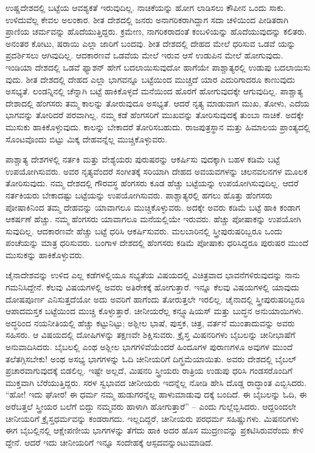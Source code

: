 ಉಷ್ಣದೇಶದಲ್ಲಿ ಬಟ್ಟೆಯ ಆವಶ್ಯಕತೆ ಇರುವುದಿಲ್ಲ. ನಾಚಿಕೆಯನ್ನು ಹೋಗ ಲಾಡಿಸಲು ಕೌಪೀನ ಒಂದು ಸಾಕು. ಉಳಿದುವೆಲ್ಲ ಕೇವಲ ಅಲಂಕಾರ. ಶೀತ ದೇಶದಲ್ಲಿ ಜನರು ಅನಾಗರಿಕರಾಗಿದ್ದಾಗ ಸದಾ ಚಳಿಯಿಂದ ಪೀಡಿತರಾಗಿ ಪ್ರಾಣಿಯ ಚರ್ಮವನ್ನು ಹೊದೆಯುತ್ತಿದ್ದರು. ಕ್ರಮೇಣ, ನಾಗರಿಕರಾದಂತೆ ಕಂಬಳಿಯನ್ನು ಹೊದೆಯುವುದನ್ನು ಕಲಿತರು. ಅನಂತರ ಕೋಟು, ಷರಾಯಿ ಎಲ್ಲಾ ಜಾರಿಗೆ ಬಂದವು. ಶೀತ ದೇಶದಲ್ಲಿ ದೇಹದ ಮೇಲೆ ಧರಿಸುವ ಒಡವೆ ಯನ್ನು ಪ್ರದರ್ಶಿಸಲು ಆಗಿವುದಿಲ್ಲ. ಆದಕಾರಣವೆ ಒಡವೆಯ ಮೇಲೆ ಇರುವ ಆಸೆ ಉಡುಪಿನ ಮೇಲೆ ಹೋಗುವುದು. ಇಂಡಿಯಾ ದೇಶದಲ್ಲಿ ಒಡವೆ ಫ್ಯಾಶನ್​ ಹೇಗೆ ಬದಲಾಯಿಸುವುದೋ ಹಾಗೆಯೇ ಪಾಶ್ಚಾತ್ಯರಲ್ಲಿ ಉಡುಪು ಬದಲಾಯಿಸು ವುದು. ಶೀತ ದೇಶದಲ್ಲಿ ದೇಹದ ಎಲ್ಲಾ ಭಾಗವನ್ನೂ ಬಟ್ಟೆಯಿಂದ ಮುಚ್ಚದೆ ಯಾರ ಎದುರಿಗಾದರೂ ಕಾಣುವುದು ಅಸಭ್ಯತೆ. ಲಂಡನ್ನಿನಲ್ಲಿ ಚೆನ್ನಾಗಿ ಬಟ್ಟೆ ಹಾಕಿಕೊಳ್ಳದೆ ಮನೆಯಿಂದ ಹೊರಗೆ ಹೋಗುವುದಕ್ಕೇ ಆಗುವುದಿಲ್ಲ. ಪಾಶ್ಚಾತ್ಯ ದೇಶಾದಲ್ಲಿ ಹೆಂಗಸರು ತಮ್ಮ ಕಾಲನ್ನು ತೋರುವುದೂ ಅಸಭ್ಯತೆ. ಆದರೆ ನೃತ್ಯ ಮಾಡುವಾಗ ಮುಖ, ತೋಳು, ಎದೆಯ ಭಾಗವನ್ನು ತೋರಿದರೆ ಪರವಾಗಿಲ್ಲ. ನಮ್ಮ ಕಡೆ ಹೆಂಗಸರಿಗೆ ಮುಖವನ್ನು ತೋರಿಸುವುದಕ್ಕೆ ತುಂಬಾ ನಾಚಿಕೆ. ಅದಕ್ಕೇ ಮುಸುಕು ಹಾಕಿಕೊಳ್ಳುವುದು. ಕಾಲನ್ನು ಬೇಕಾದರೆ ತೋರಿಸಬಹುದು. ರಾಜಪುತ್ರಸ್ಥಾನ ಮತ್ತು ಹಿಮಾಲಯ ಪ್ರಾಂತ್ಯದಲ್ಲಿ ಸೊಂಟವೊಂದು ಬಿಟ್ಟು ಮಿಕ್ಕ ದೇಹವನ್ನೆಲ್ಲ ಮುಚ್ಚಿಕೊಳ್ಳುವರು.

ಪಾಶ್ಚಾತ್ಯ ದೇಶಗಳಲ್ಲಿ ನರ್ತಕಿ ಮತ್ತು ವೇಶ್ಯೆಯರು ಪುರುಷರನ್ನು ಆಕರ್ಷಿಸು ವುದಕ್ಕಾಗಿ ಬಹಳ ಕಡಿಮೆ ಬಟ್ಟೆ ಉಪಯೋಗಿಸುವರು. ಅವರ ನೃತ್ಯವೆಂದರೆ ಸಂಗೀತಕ್ಕೆ ಸರಿಯಾಗಿ ದೇಹದ ಅವಯವಗಳನ್ನು ಚಲನವಲನಗಳ ಮೂಲಕ ತೋರಿಸುವುದು. ನಮ್ಮ ದೇಶದಲ್ಲಿ ಗೌರವಸ್ಥ ಹೆಂಗಸರು ಕೂಡ ಹೆಚ್ಚು ಬಟ್ಟೆಯನ್ನು ಉಪಯೋಗಿಸುವುದಿಲ್ಲ. ಆದರೆ ನರ್ತಕಿಯರು ಬೇಕಾದಷ್ಟು ಬಟ್ಟೆಯನ್ನು ಉಪಯೋಗಿಸುವರು. ಪಾಶ್ಚಾತ್ಯರಲ್ಲಿ ಹಗಲು ಹೊತ್ತು ಹೆಂಗಸರು ಪೋಷಾಕಿನಿಂದ ತಮ್ಮ ದೇಹವನ್ನು ಯಾವಾಗಲೂ ಮುಚ್ಚಿಕೊಳ್ಳುವರು. ಅದಕ್ಕೇ ಅವರು ಕಡಿಮೆ ಬಟ್ಟೆ ಹಾಕಿ ಕಂಡಾಗ ಆಕರ್ಷಣೆ ಹೆಚ್ಚು. ನಮ್ಮ ಹೆಂಗಸರು ಯಾವಾಗಲೂ ಮನೆಯಲ್ಲಿಯೇ ಇರುವರು. ಹೆಚ್ಚು ಪೋಷಾಕನ್ನು ಉಪಯೋಗಿ ಸುವುದಿಲ್ಲ. ಆದಕಾರಣವೇ ಹೆಚ್ಚು ಬಟ್ಟೆ ಧರಿಸಿ ಆಕರ್ಷಿಸುವರು. ಮಲಬಾರಿನಲ್ಲಿ ಸ್ತ್ರೀಪುರುಷರಿಬ್ಬರೂ ಒಂದು ಪಂಚೆಯನ್ನು ಮಾತ್ರ ಧರಿಸುವರು. ಬಂಗಾಳ ದೇಶದಲ್ಲಿ ಹೆಂಗಸರು ಕಡಿಮೆ ಪೋಷಾಕು ಧರಿಸಿದ್ದರೂ ಪುರುಷರ ಮುಂದೆ ಮುಸುಕನ್ನು ಹಾಕಿಕೊಳ್ಳುವರು.

ಚೈನಾದೇಶವನ್ನು ಉಳಿದ ಎಲ್ಲ ಕಡೆಗಳಲ್ಲಿಯೂ ಸಭ್ಯತೆಯ ವಿಷಯದಲ್ಲಿ ವಿಚಿತ್ರವಾದ ಭಾವನೆಗಳಿರುವುದನ್ನು ನಾನು ಗಮನಿಸಿದ್ದೇನೆ. ಕೆಲವು ವಿಷಯಗಳಲ್ಲಿ ಅವರು ಅತಿರೇಕಕ್ಕೆ ಹೋಗುತ್ತಾರೆ. ಇನ್ನೂ ಕೆಲವು ವಿಷಯಗಳಲ್ಲಿ ಯಾವುದು ದೋಷಪೂರ್ಣ ಎನಿಸುತ್ತದೆಯೋ ಅದು ಅವರಿಗೆ ಹಾಗೆಂದು ತೋರುತ್ತಲೇ ಇರಲಿಲ್ಲ. ಚೈನಾದಲ್ಲಿ ಸ್ತ್ರೀಪುರುಷರಿಬ್ಬರೂ ಆಪಾದಮಸ್ತಕ ಬಟ್ಟೆಯಿಂದ ಮುಚ್ಚಿ ಕೊಳ್ಳುತ್ತಾರೆ. ಚೀನೀಯರೆಲ್ಲ ಕನ್ಫ್ಯೂಷಿಯಸ್​ ಮತ್ತು ಬುದ್ಧನ ಅನುಯಾಯಿಗಳು. ಅದ್ಧರಿಂದ ನಯನೀತಿಯಲ್ಲಿ ಹೆಚ್ಚು ಕಟ್ಟುನಿಟ್ಟು; ಅಶ್ಲೀಲ ಭಾಷೆ, ಪುಸ್ತಕ, ಚಿತ್ರ, ವರ್ತನೆ ಮುಂತಾದುವನ್ನು ಅವರು ಸಹಿಸರು. ಆ ವಿಷಯದಲ್ಲಿ ದೋಷಿಗಳನ್ನು ತಕ್ಷಣವೇ ಶಿಕ್ಷಿಸುವರು. ಕ್ರೈಸ್ತ ಮಿಷನರಿಗಳು ಬೈಬಲನ್ನು ಚೀನೀಭಾಷೆಗೆ ಅನುವಾದಿಸಿದರು. ಬೈಬಲಲ್ಲಿ ಎಂಥ ಅಶ್ಲೀಲ ಭಾಗಗಳಿವೆಯೆಂದರೆ ಹಿಂದೂಗಳ ಪುರಾಣಗಳೂ ಅವುಗಳ ಮುಂದೆ ತಲೆತಗ್ಗಿಸಬೇಕು! ಅಂಥ ಅಸಭ್ಯ ಭಾಗಗಳನ್ನು ಓದಿ ಚೀನೀಯರಿಗೆ ದಿಗ್ಭ್ರಮೆಯಾಯಿತು. ಅವರು ದೇಶದಲ್ಲಿ ಬೈಬಲ್​ ಪ್ರಚಾರವಾಗುವುದಕ್ಕೆ ಬಿಡಲಿಲ್ಲ. ಇಷ್ಟೇ ಅಲ್ಲದೆ, ಮಿಷನರಿ ಸ್ತ್ರೀಯರು ರಾತ್ರಿಯ ಉಡುಪು ಧರಿಸಿ ಗಂಡಸರೊಂದಿಗೆ ಮುಕ್ತವಾಗಿ ಬೆರೆಯುತ್ತಿದ್ದರು. ಸರಳ ಸ್ವಭಾವದ ಚೀನೀಯರು ಇದನ್ನೆಲ್ಲ ನೋಡಿ ಹೇಸಿ ದೊಡ್ಡ ರಾದ್ಧಾಂತ ಎಬ್ಬಿಸಿದರು. “ಹೋ! ಇದು ಘೋರ! ಈ ಧರ್ಮ ನಮ್ಮ ಹುಡುಗರನ್ನೆಲ್ಲ ಹಾಳುಮಾಡುವು ದಕ್ಕೆ ಬಂದಿದೆ. ಈ ಬೈಬಲನ್ನು ಓದಿ, ಈ ಅರೆಬತ್ತಲೆ ಸ್ತ್ರೀಯರ ಬಲೆಗೆ ಬಿದ್ದು ನಮ್ಮವರು ಹಾಳಾಗಿ ಹೋಗುತ್ತಾರೆ” – ಎಂದು ಗುಲ್ಲೆಬ್ಬಿಸಿದರು. ಆದ್ದರಿಂದಲೇ ಚೀನೀಯರಿಗೆ ಕ್ರೈಸ್ತಧರ್ಮವನ್ನು ಕಂಡರಾಗದು. ಇಲ್ಲದಿದ್ದರೆ, ಚೀನೀಯರು ಪರಧರ್ಮ ಸಹಿಷ್ಣುಗಳು. ಮಿಷನರಿಗಳು ಈಗ ಬೈಬಲ್ಲಿನಲ್ಲಿ ಆಕ್ಷೇಪಣೀಯ ಭಾಗಗಳನ್ನು ತೆಗೆದು ಹಾಕಿ ಅದರ ಹೊಸ ಮುದ್ರಣವನ್ನು ಪ್ರಕಟಿಸಿರುವರೆಂದು ಕೇಳಿ ದ್ದೇನೆ. ಆದರೆ ಇದು ಚೀನೀಯರಿಗೆ ಇನ್ನೂ ಸಂದೇಹಕ್ಕೆ ಆಸ್ಪದವನ್ನುಂಟುಮಾಡಿದೆ.


